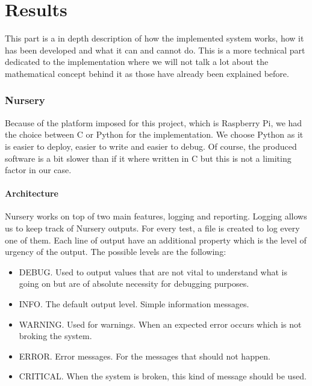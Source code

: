\documentclass[12pt]{article}
\theoremstyle{definition}
\theoremstyle{definition}
\begin{document}
\clearpage
\part{Results}

This part is a in depth description of how the implemented system works, how it has been developed and what it can and cannot do. This is a more technical part dedicated to the implementation where we will not talk a lot about the mathematical concept behind it as those have already been explained before.\\

\clearpage
\section{Nursery}

Because of the platform imposed for this project, which is Raspberry Pi, we had the choice between C or Python for the implementation. We choose Python as it is easier to deploy, easier to write and easier to debug. Of course, the produced software is a bit slower than if it where written in C but this is not a limiting factor in our case.

\subsection{Architecture}

Nursery works on top of two main features, logging and reporting. Logging allows us to keep track of Nursery outputs. For every test, a file is created to log every one of them. Each line of output have an additional property which is the level of urgency of the output. The possible levels are the following:

\begin{itemize}
\item DEBUG. Used to output values that are not vital to understand what is going on but are of absolute necessity for debugging purposes.
\item INFO. The default output level. Simple information messages.
\item WARNING. Used for warnings. When an expected error occurs which is not broking the system.
\item ERROR. Error messages. For the messages that should not happen.
\item CRITICAL. When the system is broken, this kind of message should be used.
\end{itemize}
\end{document}
